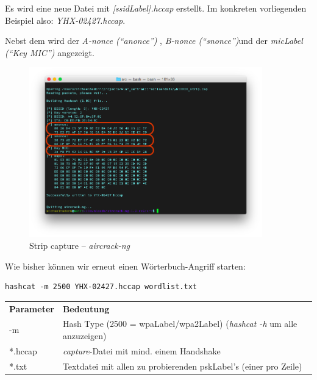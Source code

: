 Es wird eine neue Datei mit \textit{[\gls{ssidLabel}].hccap} erstellt. Im konkreten vorliegenden Beispiel also: \textit{YHX-02427.hccap}.

Nebst dem wird der \textit{A-nonce ("`anonce"')} , \textit{B-nonce ("`snonce"')}und der \textit{\gls{micLabel} ("`Key MIC"')} angezeigt.
\begin{figure}[H]
	\centering
	\includegraphics[width=0.9\textwidth]{images/wpa/conversion_cap2hccap.png}
	\caption{Strip capture -- \textit{aircrack-ng}}
\end{figure}

Wie bisher können wir erneut einen Wörterbuch-Angriff starten:
\begin{lstlisting}[style=lstStyleFramed]
hashcat -m 2500 YHX-02427.hccap wordlist.txt
\end{lstlisting}
\begin{tabular}{l l}
	\textbf{Parameter} & \textbf{Bedeutung}\\
	-m & Hash Type (2500 = \gls{wpaLabel}/\gls{wpa2Label}) (\textit{hashcat -h} um alle anzuzeigen)\\
	*.hccap & \textit{capture}-Datei mit mind. einem Handshake\\
	*.txt & Textdatei mit allen zu probierenden \gls{pskLabel}'s (einer pro Zeile)\\
\end{tabular}

